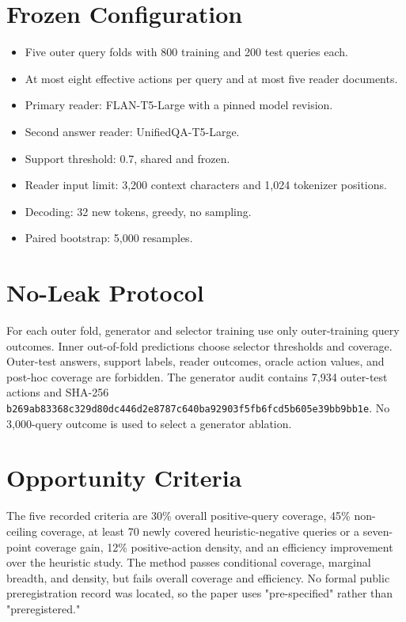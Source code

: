 \documentclass[10pt,twocolumn]{article}
\begin{document}



\clearpage
\appendix
\section{Frozen Configuration}

\begin{itemize}
\item Five outer query folds with 800 training and 200 test queries each.
\item At most eight effective actions per query and at most five reader documents.
\item Primary reader: FLAN-T5-Large with a pinned model revision.
\item Second answer reader: UnifiedQA-T5-Large.
\item Support threshold: 0.7, shared and frozen.
\item Reader input limit: 3,200 context characters and 1,024 tokenizer positions.
\item Decoding: 32 new tokens, greedy, no sampling.
\item Paired bootstrap: 5,000 resamples.
\end{itemize}

\section{No-Leak Protocol}

For each outer fold, generator and selector training use only outer-training query outcomes. Inner out-of-fold predictions choose selector thresholds and coverage. Outer-test answers, support labels, reader outcomes, oracle action values, and post-hoc coverage are forbidden. The generator audit contains 7,934 outer-test actions and SHA-256 \nolinkurl{b269ab83368c329d80dc446d2e8787c640ba92903f5fb6fcd5b605e39bb9bb1e}. No 3,000-query outcome is used to select a generator ablation.

\section{Opportunity Criteria}

The five recorded criteria are 30\% overall positive-query coverage, 45\% non-ceiling coverage, at least 70 newly covered heuristic-negative queries or a seven-point coverage gain, 12\% positive-action density, and an efficiency improvement over the heuristic study. The method passes conditional coverage, marginal breadth, and density, but fails overall coverage and efficiency. No formal public preregistration record was located, so the paper uses "pre-specified" rather than "preregistered."
\end{document}
